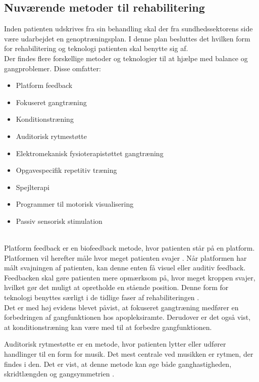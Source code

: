 \subsection{Nuværende metoder til rehabilitering}

Inden patienten udskrives fra sin behandling skal der fra sundhedssektorens side være udarbejdet en genoptræningsplan. I denne plan besluttes det hvilken form for rehabilitering og teknologi patienten skal benytte sig af. \cite{Sundhedsstyrelsen2011a} \\
Der findes flere forskellige metoder og teknologier til at hjælpe med balance og gangproblemer. Disse omfatter: \cite{Sundhedsstyrelsen2011a}  

\begin{itemize}
\item Platform feedback
\item Fokuseret gangtræning
\item Konditionstræning
\item Auditorisk rytmestøtte
\item Elektromekanisk fysioterapistøttet gangtræning
\item Opgavespecifik repetitiv træning
\item Spejlterapi
\item Programmer til motorisk visualisering
\item Passiv sensorisk stimulation
\end{itemize} \\

Platform feedback er en biofeedback metode, hvor patienten står på en platform. Platformen vil herefter måle hvor meget patienten svajer . Når platformen har målt svajningen af patienten, kan denne enten få visuel eller auditiv feedback. Feedbacken skal gøre patienten mere opmærksom på, hvor meget kroppen svajer, hvilket gør det muligt at opretholde en stående position. \cite{Barclay-Goddard2004}
Denne form for teknologi benyttes særligt i de tidlige faser af rehabiliteringen \cite{Sundhedsstyrelsen2011a}. \\
Det er med høj evidens blevet påvist, at fokuseret gangtræning medfører en forbedringen af gangfunktionen hos apopleksiramte\cite{Sundhedsstyrelsen2010}. Derudover er det også vist, at konditionstræning kan være med til at forbedre gangfunktionen\cite{Sundhedsstyrelsen2010}.

Auditorisk rytmestøtte er en metode, hvor patienten lytter eller udfører handlinger til en form for musik. Det mest centrale ved musikken er rytmen, der findes i den. \cite{Bradt2010} Det er vist, at denne metode kan øge både ganghastigheden, skridtlængden og gangsymmetrien \cite{Sundhedsstyrelsen2010}.

